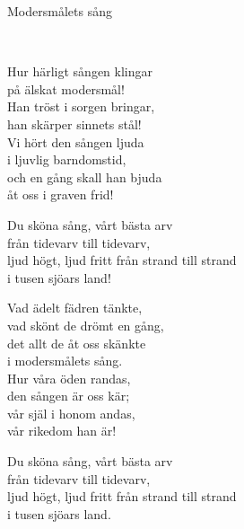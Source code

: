 \begin{song}{Modersmålets sång}
	
	
	\\
	
	Hur härligt sången klingar\\
	på älskat modersmål!\\
	Han tröst i sorgen bringar,\\
	han skärper sinnets stål!\\
	Vi hört den sången ljuda\\
	i ljuvlig barndomstid,\\
	och en gång skall han bjuda\\
	åt oss i graven frid!
	
	Du sköna sång, vårt bästa arv\\
	från tidevarv till tidevarv,\\
	ljud högt, ljud fritt från strand till strand\\
	i tusen sjöars land!
	
	Vad ädelt fädren tänkte,\\
	vad skönt de drömt en gång,\\
	det allt de åt oss skänkte\\
	i modersmålets sång.\\
	Hur våra öden randas,\\
	den sången är oss kär;\\
	vår själ i honom andas,\\
	vår rikedom han är!
	
	Du sköna sång, vårt bästa arv\\
	från tidevarv till tidevarv,\\
	ljud högt, ljud fritt från strand till strand\\
	i tusen sjöars land.
	
\end{song}
